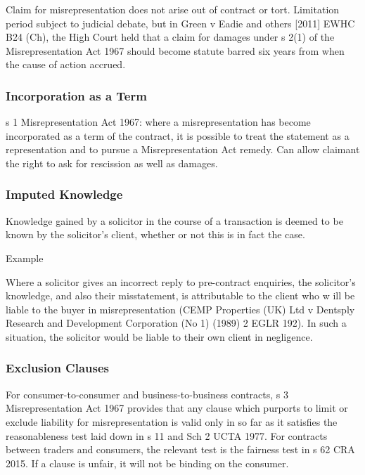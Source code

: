 \documentclass[
]{article}
\newenvironment{env-4d86b145-82dd-4772-a680-deba5516c751}
{
    \savenotes\tcolorbox[blanker,breakable,left=5pt,borderline west={2pt}{-4pt}{purple}]
}
{
    \endtcolorbox\spewnotes
}
\begin{document}
Claim for misrepresentation does not arise out of contract or tort.
Limitation period subject to judicial debate, but in Green v Eadie and
others {[}2011{]} EWHC B24 (Ch), the High Court held that a claim for
damages under s 2(1) of the Misrepresentation Act 1967 should become
statute barred six years from when the cause of action accrued.

\hypertarget{incorporation-as-a-term}{%
\subsubsection{Incorporation as a Term}\label{incorporation-as-a-term}}

s 1 Misrepresentation Act 1967: where a misrepresentation has become
incorporated as a term of the contract, it is possible to treat the
statement as a representation and to pursue a Misrepresentation Act
remedy. Can allow claimant the right to ask for rescission as well as
damages.

\hypertarget{imputed-knowledge}{%
\subsubsection{Imputed Knowledge}\label{imputed-knowledge}}

Knowledge gained by a solicitor in the course of a transaction is deemed
to be known by the solicitor's client, whether or not this is in fact
the case.

\begin{env-4d86b145-82dd-4772-a680-deba5516c751}

Example

Where a solicitor gives an incorrect reply to pre-contract enquiries,
the solicitor's knowledge, and also their misstatement, is attributable
to the client who w ill be liable to the buyer in misrepresentation
(CEMP Properties (UK) Ltd v Dentsply Research and Development
Corporation (No 1) (1989) 2 EGLR 192). In such a situation, the
solicitor would be liable to their own client in negligence.

\end{env-4d86b145-82dd-4772-a680-deba5516c751}

\hypertarget{exclusion-clauses-1}{%
\subsubsection{Exclusion Clauses}\label{exclusion-clauses-1}}

For consumer-to-consumer and business-to-business contracts, s 3
Misrepresentation Act 1967 provides that any clause which purports to
limit or exclude liability for misrepresentation is valid only in so far
as it satisfies the reasonableness test laid down in s 11 and Sch 2 UCTA
1977. For contracts between traders and consumers, the relevant test is
the fairness test in s 62 CRA 2015. If a clause is unfair, it will not
be binding on the consumer.
\end{document}
